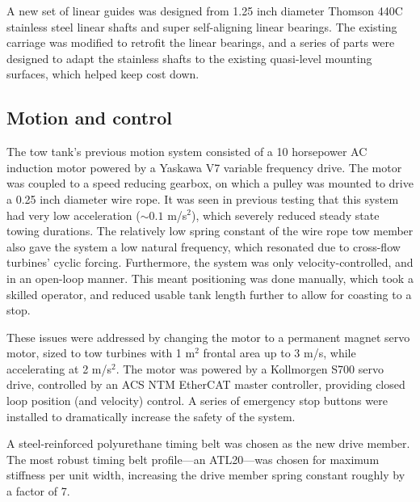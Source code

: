A new set of linear guides was designed from 1.25 inch diameter Thomson 440C
stainless steel linear shafts and super self-aligning linear bearings. The
existing carriage was modified to retrofit the linear bearings, and a series of
parts were designed to adapt the stainless shafts to the existing quasi-level
mounting surfaces, which helped keep cost down.

\subsection{Motion and control}

The tow tank's previous motion system consisted of a 10 horsepower AC induction
motor powered by a Yaskawa V7 variable frequency drive. The motor was coupled to
a speed reducing gearbox, on which a pulley was mounted to drive a 0.25 inch
diameter wire rope. It was seen in previous testing that this system had very
low acceleration ($\sim 0.1$ m/s$^2$), which severely reduced steady state
towing durations. The relatively low spring constant of the wire rope tow member
also gave the system a low natural frequency, which resonated due to cross-flow
turbines' cyclic forcing. Furthermore, the system was only velocity-controlled,
and in an open-loop manner. This meant positioning was done manually, which took
a skilled operator, and reduced usable tank length further to allow for coasting
to a stop.

These issues were addressed by changing the motor to a permanent magnet servo
motor, sized to tow turbines with 1 m$^2$ frontal area up to 3 m/s, while
accelerating at 2 m/s$^2$. The motor was powered by a Kollmorgen S700 servo
drive, controlled by an ACS NTM EtherCAT master controller, providing closed
loop position (and velocity) control. A series of emergency stop buttons were
installed to dramatically increase the safety of the system.

A steel-reinforced polyurethane timing belt was chosen as the new drive member.
The most robust timing belt profile---an ATL20---was chosen for maximum
stiffness per unit width, increasing the drive member spring constant roughly by a
factor of 7.



